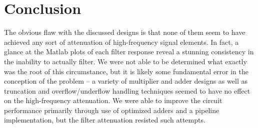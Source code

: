 \section*{Conclusion}
The obvious flaw with the discussed designs is that none of them seem to have achieved any sort of attenuation of high-frequency signal elements. In fact, a glance at the Matlab plots of each filter response reveal a stunning consistency in the inability to actually filter. We were not able to be determined what exactly was the root of this circumstance, but it is likely some fundamental error in the conception of the problem -- a variety of multiplier and adder designs as well as truncation and overflow/underflow handling techniques seemed to have no effect on the high-frequency attenuation. We were able to improve the circuit performance primarily through use of optimized adders and a pipeline implementation, but the filter attenuation resisted such attempts.
